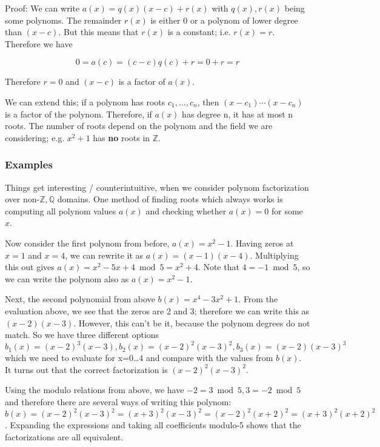 Proof: We can write \(a(x) = q(x)(x-c) + r(x)\) with \(q(x), r(x)\)
being some polynoms. The remainder \(r(x)\) is either 0 or a polynom of
lower degree than \((x-c)\). But this means that \(r(x)\) is a constant;
i.e. \(r(x) = r\). Therefore we have

\[
0 = a(c) = (c - c)q(c) + r = 0 + r = r
\]

Therefore \(r=0\) and \((x-c)\) is a factor of \(a(x)\).

We can extend this; if a polynom has roots \(c_1, \ldots,c_n\), then
\((x-c_1)\cdots(x-c_n)\) is a factor of the polynom. Therefore, if
\(a(x)\) has degree n, it has at most n roots. The number of roots
depend on the polynom and the field we are considering; e.g. \(x^2+1\)
has \textbf{no} roots in \(\mathbb{Z}\).

\subsubsection{Examples}\label{examples-1}

Things get interesting / counterintuitive, when we consider polynom
factorization over non-\(\mathbb{Z, Q}\) domains. One method of finding
roots which always works is computing all polynom values \(a(x)\) and
checking whether \(a(x)=0\) for some \(x\).

Now consider the first polynom from before, \(a(x) = x^2-1\). Having
zeros at \(x=1\) and \(x=4\), we can rewrite it as
\(a(x) = (x-1)(x-4)\). Multiplying this out gives
\(a(x) = x^2 - 5x + 4 \bmod 5 = x^2 + 4\). Note that \(4 = -1 \bmod 5\),
so we can write the polynom also as \(a(x) = x^2-1\).

Next, the second polynomial from above \(b(x) = x^4 - 3x^2 + 1\). From
the evaluation above, we see that the zeros are 2 and 3; therefore we
can write this as \((x-2)(x-3)\). However, this can't be it, because the
polynom degrees do not match. So we have three different options
\(b_1(x) = (x-2)^3(x-3), b_2(x) = (x-2)^2(x-3)^2, b_3(x) = (x-2)(x-3)^3\)
which we need to evaluate for x=0\ldots{}4 and compare with the values
from \(b(x)\). It turns out that the correct factorization is
\((x-2)^2(x-3)^2\).

Using the modulo relations from above, we have
\(-2 = 3 \bmod 5, 3 = -2 \bmod 5\) and therefore there are several ways of
writing this polynom:
\(b(x) = (x-2)^2 (x-3)^2 = (x+3)^2 (x-3)^2 = (x-2)^2 (x+2)^2 = (x+3)^2(x+2)^2\).
Expanding the expressions and taking all coefficients modulo-5 shows
that the factorizations are all equivalent.

